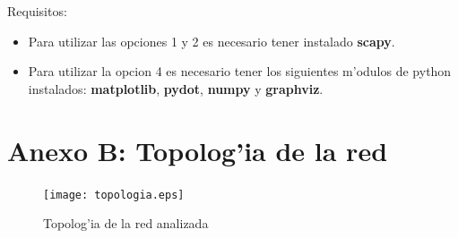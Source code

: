 \documentclass[a4paper,10pt]{article}
\begin{document}
\noindent Requisitos:
\noindent \begin{itemize}
\item	Para utilizar las opciones 1 y 2 es necesario tener instalado \textbf{scapy}.
\item	Para utilizar la opcion 4 es necesario tener los siguientes m'odulos de python instalados: \textbf{matplotlib}, \textbf{pydot}, \textbf{numpy} y \textbf{graphviz}.
\end{itemize}

\newpage

\thispagestyle{empty}
\section{Anexo B: Topolog'ia de la red}

\begin{figure}[!hbp]
\begin{center}
\texttt{[image: topologia.eps]}
\end{center}
\caption{Topolog'ia de la red analizada} \label{figura6}
\end{figure}

\restoregeometry
\end{document}
